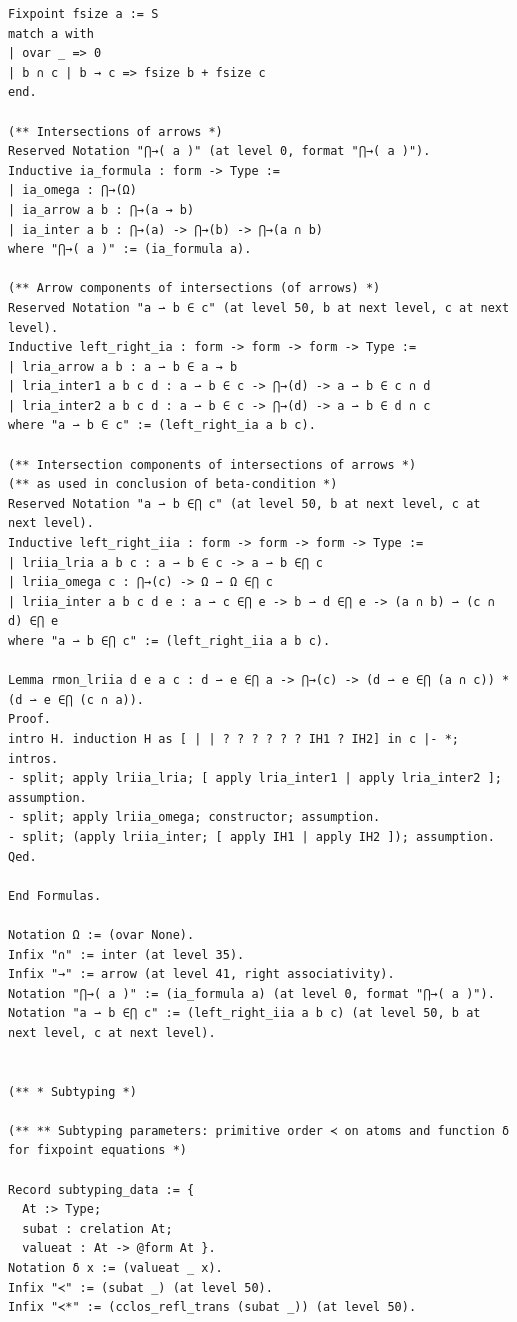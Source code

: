 \documentclass[10pt,a4paper]{article}
\begin{document}
\begin{lstlisting}
Fixpoint fsize a := S
match a with
| ovar _ => 0
| b ∩ c | b → c => fsize b + fsize c
end.

(** Intersections of arrows *)
Reserved Notation "⋂→( a )" (at level 0, format "⋂→( a )").
Inductive ia_formula : form -> Type :=
| ia_omega : ⋂→(Ω)
| ia_arrow a b : ⋂→(a → b)
| ia_inter a b : ⋂→(a) -> ⋂→(b) -> ⋂→(a ∩ b)
where "⋂→( a )" := (ia_formula a).

(** Arrow components of intersections (of arrows) *)
Reserved Notation "a ⇀ b ∈ c" (at level 50, b at next level, c at next level).
Inductive left_right_ia : form -> form -> form -> Type :=
| lria_arrow a b : a ⇀ b ∈ a → b
| lria_inter1 a b c d : a ⇀ b ∈ c -> ⋂→(d) -> a ⇀ b ∈ c ∩ d
| lria_inter2 a b c d : a ⇀ b ∈ c -> ⋂→(d) -> a ⇀ b ∈ d ∩ c
where "a ⇀ b ∈ c" := (left_right_ia a b c).

(** Intersection components of intersections of arrows *)
(** as used in conclusion of beta-condition *)
Reserved Notation "a ⇀ b ∈⋂ c" (at level 50, b at next level, c at next level).
Inductive left_right_iia : form -> form -> form -> Type :=
| lriia_lria a b c : a ⇀ b ∈ c -> a ⇀ b ∈⋂ c
| lriia_omega c : ⋂→(c) -> Ω ⇀ Ω ∈⋂ c
| lriia_inter a b c d e : a ⇀ c ∈⋂ e -> b ⇀ d ∈⋂ e -> (a ∩ b) ⇀ (c ∩ d) ∈⋂ e
where "a ⇀ b ∈⋂ c" := (left_right_iia a b c).

Lemma rmon_lriia d e a c : d ⇀ e ∈⋂ a -> ⋂→(c) -> (d ⇀ e ∈⋂ (a ∩ c)) * (d ⇀ e ∈⋂ (c ∩ a)).
Proof.
intro H. induction H as [ | | ? ? ? ? ? ? IH1 ? IH2] in c |- *; intros.
- split; apply lriia_lria; [ apply lria_inter1 | apply lria_inter2 ]; assumption.
- split; apply lriia_omega; constructor; assumption.
- split; (apply lriia_inter; [ apply IH1 | apply IH2 ]); assumption.
Qed.

End Formulas.

Notation Ω := (ovar None).
Infix "∩" := inter (at level 35).
Infix "→" := arrow (at level 41, right associativity).
Notation "⋂→( a )" := (ia_formula a) (at level 0, format "⋂→( a )").
Notation "a ⇀ b ∈⋂ c" := (left_right_iia a b c) (at level 50, b at next level, c at next level).


(** * Subtyping *)

(** ** Subtyping parameters: primitive order ≺ on atoms and function δ for fixpoint equations *)

Record subtyping_data := {
  At :> Type;
  subat : crelation At;
  valueat : At -> @form At }.
Notation δ x := (valueat _ x).
Infix "≺" := (subat _) (at level 50).
Infix "≺*" := (cclos_refl_trans (subat _)) (at level 50).


\end{lstlisting}
\end{document}
